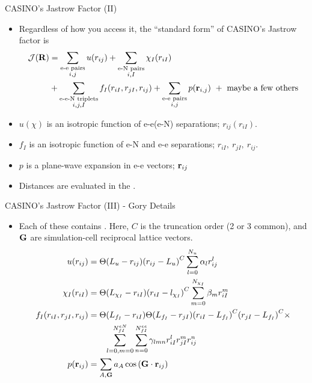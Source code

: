 \documentclass[12pt, pdf, hyperref={draft}, usenames, dvipsnames,
aspectratio=169]{beamer}
\newcommand{\blue}[1]{{\bf\color{NavyBlue}{#1}}}
\newcommand{\green}[1]{{\bf\color{ForestGreen}{#1}}}
\begin{document}
\begin{frame}{CASINO's Jastrow Factor (II)}

\begin{itemize}
  \item Regardless of how you access it, the ``standard form'' of CASINO's
  Jastrow factor is
  \begin{align}
    \mathcal{J}({\bf R}) &= \sum_{\substack{\text{e-e pairs} \\ i,j }} u(r_{ij})
    + \sum_{\substack{\text{e-N pairs} \\ i, I}}\chi_{I}(r_{iI}) \nonumber \\
    &+ \sum_{\substack{\text{e-e-N triplets} \\ i, j, I}}f_I(r_{iI}, r_{jI}, r_{ij})
    + \sum_{\substack{\text{e-e pairs} \\ i, j}}p({\bf r}_{i, j}) \ +
    \ \text{maybe a few others}
  \end{align}
  \item $u(\chi)$ is an isotropic function of e-e\@(e-N) separations;
  $r_{ij}(r_{iI})$.
  \item $f_I$ is an isotropic function of e-N and e-e separations; $r_{iI},\
  r_{jI},\ r_{ij}$.
  \item $p$ is a plane-wave expansion in e-e vectors; ${\bf r}_{ij}$
  \item Distances are evaluated in the \blue{minimum image convention}.
\end{itemize}
\end{frame}


\begin{frame}{CASINO's Jastrow Factor (III) - Gory Details}

\begin{itemize}
  \item Each of these contains \green{optimisable parameters}. Here, $C$ is the
  truncation order (2 or 3 common), and ${\bf G}$ are simulation-cell
  reciprocal lattice vectors.
  \begin{align}
    u(r_{ij}) &= \Theta(L_u - r_{ij}){(r_{ij} - L_u)}^C
    \sum^{N_u}_{l=0}\alpha_l r^{l}_{ij} \nonumber \\
    \chi_I(r_{iI}) &= \Theta(L_{\chi_I} - r_{iI}){(r_{iI} - l_{\chi_I})}^C
    \sum^{N_{\chi_I}}_{m=0} \beta_m r^m_{iI}  \nonumber \\
    f_I(r_{iI}, r_{jI}, r_{ij}) &= \Theta(L_{f_I} - r_{iI})  \Theta(L_{f_I} -
    r_{jI}) {(r_{iI} - L_{f_I})}^C{(r_{jI} - L_{f_I})}^C \times \nonumber \\
    &\qquad \sum^{N^{eN}_{fI}}_{l=0,m=0}  \sum^{N^{ee}_{fI}}_{n=0}
    \gamma_{lmn} r^{l}_{iI}r^{m}_{jI}r^{n}_{ij}
    \nonumber \\
    p({\bf r}_{ij}) &= \sum_{A, {\bf G}} a_A \cos{({\bf G} \cdot {\bf r}_{ij})}
  \end{align}
\end{itemize}
\end{frame}
\end{document}
